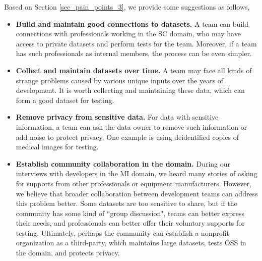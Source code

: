 Based on Section \ref{sec_pain_points_3}, we provide some suggestions as follows,
\begin{itemize}
\item \textbf{Build and maintain good connections to datasets.} A team can build connections with professionals working in the SC domain, who may have access to private datasets and perform tests for the team. Moreover, if a team has such professionals as internal members, the process can be even simpler.

\item \textbf{Collect and maintain datasets over time.} A team may face all kinds of strange problems caused by various unique inputs over the years of development. It is worth collecting and maintaining these data, which can form a good dataset for testing.

\item \textbf{Remove privacy from sensitive data.} For data with sensitive information, a team can ask the data owner to remove such information or add noise to protect privacy. One example is using deidentified copies of medical images for testing.

\item \textbf{Establish community collaboration in the domain.} During our interviews with developers in the MI domain, we heard many stories of asking for supports from other professionals or equipment manufacturers. However, we believe that broader collaboration between development teams can address this problem better. Some datasets are too sensitive to share, but if the community has some kind of ``group discussion", teams can better express their needs, and professionals can better offer their voluntary supports for testing. Ultimately, perhaps the community can establish a nonprofit organization as a third-party, which maintains large datasets, tests OSS in the domain, and protects privacy.
\end{itemize}
